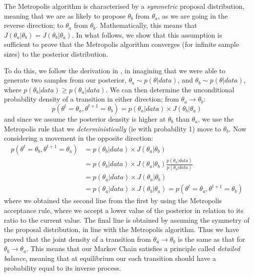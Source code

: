 \documentclass[11pt,fullpage]{book}
\begin{document}
The Metropolis algorithm is characterised by a \textit{symmetric} proposal distribution, meaning that we are as likely to propose $\theta_b$ from $\theta_a$, as we are going in the reverse direction; to $\theta_a$ from $\theta_b$. Mathematically, this means that $J(\theta_a|\theta_b)=J(\theta_b|\theta_a)$. In what follows, we show that this assumption is sufficient to prove that the Metropolis algorithm converges (for infinite sample sizes) to the posterior distribution.

To do this, we follow the derivation in \cite{gelman2013bayesian}, in imagining that we were able to generate two samples from our posterior, $\theta_a\sim p(\theta|data)$, and $\theta_b\sim p(\theta|data)$, where $p(\theta_b|data)\geq p(\theta_a|data)$. We can then determine the unconditional probability density of a transition in either direction; from $\theta_a\rightarrow\theta_b$:
%
\begin{equation}
p(\theta^{t}=\theta_a,\theta^{t+1}=\theta_b) = p(\theta_a|data)\times J(\theta_b|\theta_a)
\end{equation}
%
and since we assume the posterior density is higher at $\theta_b$ than $\theta_a$, we use the Metropolis rule that we \textit{deterministically} (ie with probability 1) move to $\theta_b$. Now considering a movement in the opposite direction:
%
\begin{equation}
\begin{align}
p(\theta^{t} = \theta_b,\theta^{t+1}=\theta_a) &= p(\theta_b|data)\times J(\theta_a|\theta_b)\\
&= p(\theta_b|data) \times J(\theta_a|\theta_b) \frac{p(\theta_a|data)}{p(\theta_b|data)}\\
&= p(\theta_a|data)\times J(\theta_a|\theta_b)\\
&= p(\theta_a|data)\times J(\theta_b|\theta_a)=p(\theta^{t}=\theta_a,\theta^{t+1}=\theta_b)
\end{align}
\end{equation}
%
where we obtained the second line from the first by using the Metropolis acceptance rule, where we accept a lower value of the posterior in relation to its ratio to the current value. The final line is obtained by assuming the symmetry of the proposal distribution, in line with the Metropolis algorithm. Thus we have proved that the joint density of a transition from $\theta_a\rightarrow\theta_b$ is the same as that for $\theta_b\rightarrow\theta_a$. This means that our Markov Chain satisfies a principle called \textit{detailed balance}, meaning that at equilibrium our each transition should have a probability equal to its inverse process. 
\end{document}
